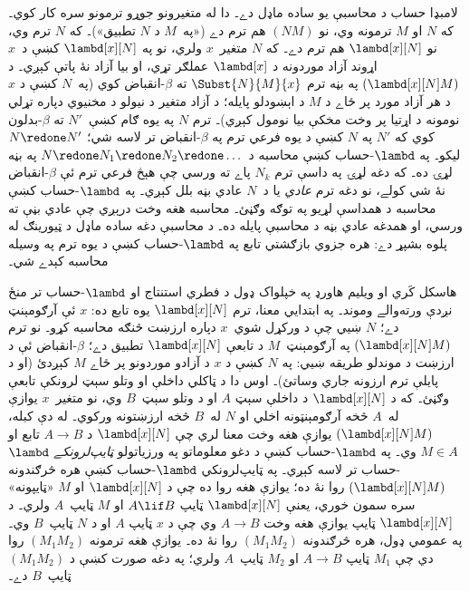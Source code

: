 \documentclass[../../../include/open-logic-section]{subfiles}
\begin{document}


لامبډا حساب د محاسبې يو ساده ماډل دے۔ دا له متغيرونو جوړو
ترمونو سره کار کوي۔ که $N$ او $M$ ترمونه وي، نو $(NM)$ هم
ترم دے («په~$M$ د $N$ تطبيق»)۔ که $N$ ترم وي، نو
$\lambd[x][N]$ هم ترم دے۔ که $N$ متغير~$x$ ولري، نو په
$\lambd[x][N]$ کښې د~$x$ اړوند آزاد موردونه د $\lambd[x]$
عملګر تړي، او بيا آزاد نۀ پاتې کېږي۔ د $(\lambd[x][N]M)$
په بڼه ترم $\Subst{N}{M}{x}$ ته $\beta$-انقباض کوي
(په~$N$ کښې د $x$ د هر آزاد مورد پر ځاے د $M$ د اېښودلو
پايله؛ د آزاد متغير د نيولو د مخنيوي دپاره تړلي نومونه د اړتيا
پر وخت مخکې بيا نومول کېږي)۔ ترم $N$ په يوه ګام کښې~$N'$
ته $\beta$-بدلون کوي که $N'$ په $N$ کښې د يوه فرعي ترم
په $\beta$-انقباض تر لاسه شي؛ $N \redone N'$ ليکو۔ په
$\lambd$-حساب کښې محاسبه د $N \redone N_1
\redone N_2 \redone \dots$ په بڼه لړۍ ده۔ که دغه لړۍ په
داسې ترم $N_k$ پاے ته ورسي چې هېڅ فرعي ترم ئې
$\beta$-انقباض نۀ شي کولے، نو دغه ترم \emph{عادي} يا
د~$N$ عادي بڼه بلل کېږي۔ په $\lambd$-حساب کښې محاسبه د
همداسې لړيو په توګه وګڼئ۔ محاسبه هغه وخت درېږي چې عادي بڼې
ته ورسي، او همدغه عادي بڼه د محاسبې پايله ده۔ د محاسبې دغه
ساده ماډل د ټيورينګ له پلوه بشپړ دے: هره جزوي بازګشتي تابع په
$\lambd$-حساب کښې د يوه ترم په وسيله محاسبه کېدے شي۔

هاسکل کَري او ويليم هاورډ په خپلواک ډول د فطري استنتاج او
$\lambd$-حساب تر منځ نږدې ورته‌والے وموند۔ په ابتدايي معنا،
ترم $\lambd[x][N]$ يوه تابع ده: $x$ ئې آرګومېنټ دے؛ $N$
ښيي چې د ورکړل شوي~$x$ دپاره ارزښت څنګه محاسبه کړو۔ نو
ترم $(\lambd[x][N]M)$ په آرګومېنټ~$M$ د تابعې
$\lambd[x][N]$ تطبيق دے؛ $\beta$-انقباض ئې د ارزښت د
موندلو طريقه ښيي: په $N$ کښې د $x$ د آزادو موردونو پر ځاے
$M$ کېږدئ (او د پايلې ترم ارزونه جاري وساتئ)۔ اوس دا د
ټاکلي داخلې او وتلو سېټ لرونکې تابعې وګڼئ۔ که د
$\lambd[x][N]$ د داخلې سېټ $A$ او د وتلو سېټ~$B$ وي،
نو متغير~$x$ يوازې له~$A$ څخه آرګومېنټونه اخلي او $N$
له~$B$ څخه ارزښتونه ورکوي۔ له دې کبله، $(\lambd[x][N]M)$
يوازې هغه وخت معنا لري چې $\lambd[x][N]$ د $A \to B$
تابع او $M \in A$ وي۔ په $\lambd$-حساب کښې د دغو
معلوماتو په ورزياتولو \emph{ټايپ‌لرونکے} $\lambd$-حساب
تر لاسه کېږي۔ په ټايپ‌لرونکي $\lambd$-حساب کښې هره څرګندونه
$(\lambd[x][N]M)$ روا نۀ ده؛ يوازې هغه روا ده چې د
$\lambd[x][N]$ او $M$ «ټايپونه» سره سمون خوري، يعنې
$\lambd[x][N]$ ټايپ $A \lif B$ او $M$ ټايپ~$A$ ولري۔
د $\lambd[x][N]$ ټايپ يوازې هغه وخت $A \to B$ وي چې
د $x$ ټايپ $A$ او د $N$ ټايپ~$B$ وي۔ په عمومي ډول، هره
څرګندونه $(M_1M_2)$ روا نۀ ده۔ يوازې هغه ترمونه $(M_1M_2)$
روا دي چې $M_1$ ټايپ $A \to B$ او $M_2$ ټايپ~$A$
ولري؛ په دغه صورت کښې د $(M_1M_2)$ ټايپ~$B$ دے۔
\end{document}
